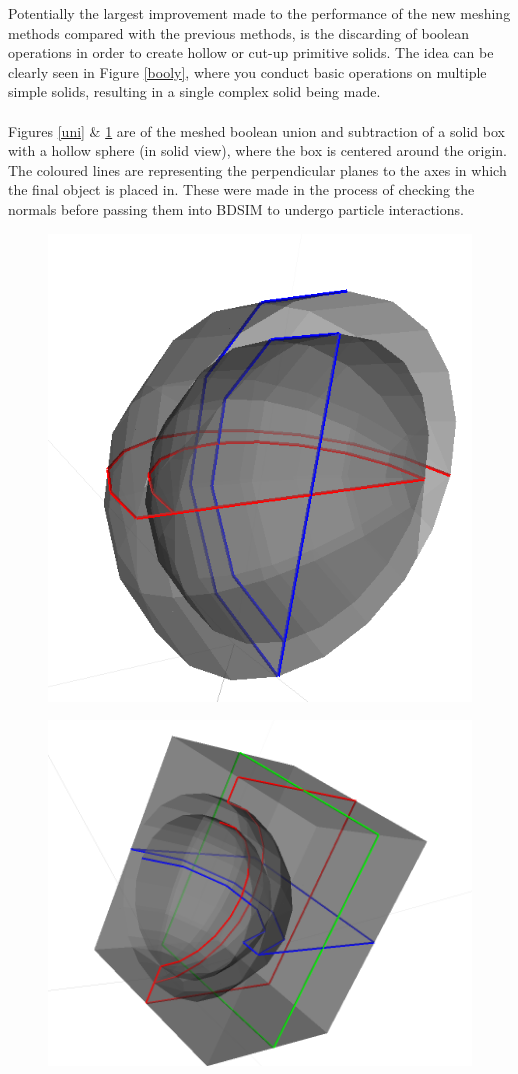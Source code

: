 \documentclass[12pt,a4paper]{article}
\begin{document}
\noindent Potentially the largest improvement made to the performance of the new meshing methods compared with the previous methods, is the discarding of boolean operations in order to create hollow or cut-up primitive solids. The idea can be clearly seen in Figure \ref{booly}, where you conduct basic operations on multiple simple solids, resulting in a single complex solid being made.
\\\\
\noindent Figures \ref{uni} \& \ref{sub} are of the meshed boolean union and subtraction of a solid box with a hollow sphere (in solid view), where the box is centered around the origin. The coloured lines are representing the perpendicular planes to the axes in which the final object is placed in. These were made in the process of checking the normals before passing them into BDSIM to undergo particle interactions.
\\
\begin{figure}[h!]
\centering
\begin{minipage}{.4\textwidth}
  \centering
  \includegraphics[height=0.5\linewidth]{Images//Booleans/SphereUnion.png}
  \label{uni}
\end{minipage}%
\begin{minipage}{.4\textwidth}
  \centering
  \includegraphics[height=0.5\linewidth]{Images//Booleans//SphereSubtraction.png}
  \label{sub}
\end{minipage}%
\end{figure}
\end{document}
